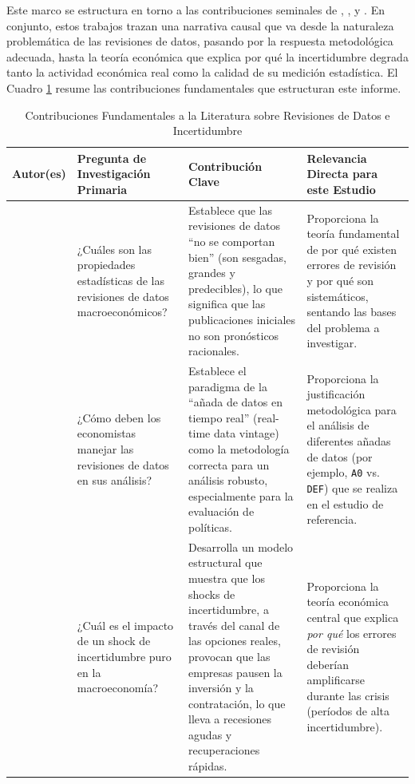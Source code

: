 \documentclass{article}
\begin{document}
Este marco se estructura en torno a las contribuciones seminales de \citet{aruoba2008}, \citet{croushore2011}, \citet{bloom2009} y \citet{baker2016}. En conjunto, estos trabajos trazan una narrativa causal que va desde la naturaleza problemática de las revisiones de datos, pasando por la respuesta metodológica adecuada, hasta la teoría económica que explica por qué la incertidumbre degrada tanto la actividad económica real como la calidad de su medición estadística. El Cuadro \ref{tab:contribuciones} resume las contribuciones fundamentales que estructuran este informe.

\begin{table}[h!]
\centering
\caption{Contribuciones Fundamentales a la Literatura sobre Revisiones de Datos e Incertidumbre}
\label{tab:contribuciones}
    \begin{tabularx}{\textwidth}{|l|X|X|X|}
        \hline
        \textbf{Autor(es)} & \textbf{Pregunta de Investigación Primaria} & \textbf{Contribución Clave} & \textbf{Relevancia Directa para este Estudio} \\
        \hline
        \citet{aruoba2008} & ¿Cuáles son las propiedades estadísticas de las revisiones de datos macroeconómicos? & Establece que las revisiones de datos ``no se comportan bien'' (son sesgadas, grandes y predecibles), lo que significa que las publicaciones iniciales no son pronósticos racionales. & Proporciona la teoría fundamental de por qué existen errores de revisión y por qué son sistemáticos, sentando las bases del problema a investigar. \\
        \hline
        \citet{croushore2011} & ¿Cómo deben los economistas manejar las revisiones de datos en sus análisis? & Establece el paradigma de la ``añada de datos en tiempo real'' (real-time data vintage) como la metodología correcta para un análisis robusto, especialmente para la evaluación de políticas. & Proporciona la justificación metodológica para el análisis de diferentes añadas de datos (por ejemplo, \texttt{A0} vs. \texttt{DEF}) que se realiza en el estudio de referencia. \\
        \hline
        \citet{bloom2009} & ¿Cuál es el impacto de un shock de incertidumbre puro en la macroeconomía? & Desarrolla un modelo estructural que muestra que los shocks de incertidumbre, a través del canal de las opciones reales, provocan que las empresas pausen la inversión y la contratación, lo que lleva a recesiones agudas y recuperaciones rápidas. & Proporciona la teoría económica central que explica \textit{por qué} los errores de revisión deberían amplificarse durante las crisis (períodos de alta incertidumbre). \\

\end{tabularx}
\end{table}
\end{document}
